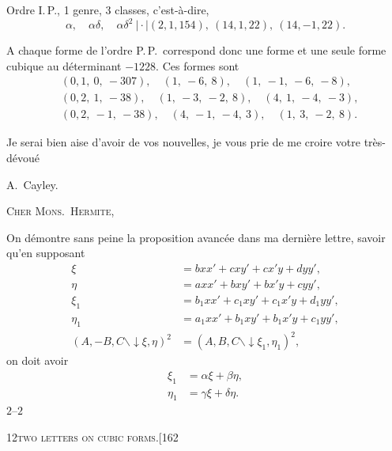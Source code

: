 \documentclass[11pt]{article}
\begin{document}
\medskip

\noindent Ordre I.\,P., 1 genre, 3 classes, c'est-\`a-dire,
\[
\alpha,\quad \alpha\delta,\quad \alpha\delta^{2}\ \big| \cdot \big| (2, 1, 154),\ (14, 1, 22),\ (14, -1, 22).
\]

A chaque forme de l'ordre P.\,P.\ correspond donc une forme et une seule forme
cubique au d\'eterminant $-1228$. Ces formes sont
\begin{align*}
&(0, 1,\ 0,\ -307),\quad (1,\ -6,\ 8),\quad (1,\ -1,\ -6,\ -8),\\
&(0, 2,\ 1,\ -38),\quad (1,\ -3,\ -2,\ 8),\quad (4,\ 1,\ -4,\ -3),\\
&(0, 2,\ -1,\ -38),\quad (4,\ -1,\ -4,\ 3),\quad (1,\ 3,\ -2,\ 8).
\end{align*}

Je serai bien aise d'avoir de vos nouvelles, je vous prie de me croire votre tr\`es-d\'evou\'e
\medskip

\hfill A.~Cayley.

\bigskip

\noindent\textsc{Cher Mons.\ Hermite,}

On d\'emontre sans peine la proposition avanc\'ee dans ma derni\`ere lettre, savoir
qu'en supposant
\begin{align*}
\xi &= bxx' + cxy' + cx'y + dyy',\\
\eta &= axx' + bxy' + bx'y + cyy',\\
\xi_{1} &= b_{1}xx' + c_{1}xy' + c_{1}x'y + d_{1}yy',\\
\eta_{1} &= a_{1}xx' + b_{1}xy' + b_{1}x'y + c_{1}yy',\\
(A, -B, C \mathbin{\backslash\!\!\!\downarrow} \xi, \eta)^{2} &= (A, B, C \mathbin{\backslash\!\!\!\downarrow} \xi_{1}, \eta_{1})^{2},
\end{align*}
on doit avoir
\begin{align*}
\xi_{1} &= \alpha\xi + \beta\eta,\\
\eta_{1} &= \gamma\xi + \delta\eta.
\end{align*}
\hfill $2$--$2$

\newpage

\begin{center}
\small\textsc{12}\hfill\textsc{two letters on cubic forms.}\hfill[162
\end{center}

\medskip
\end{document}
